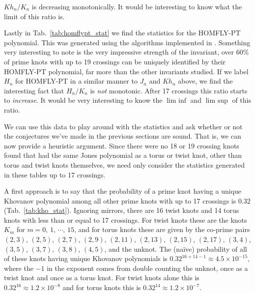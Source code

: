     $Kh_{n}/K_{n}$ is decreasing monotonically. It would be interesting to
    know what the limit of this ratio is.
    \par\hfill\par
    Lastly in Tab.~\ref{tab:homflypt_stat} we find the statistics for the
    HOMFLY-PT polynomial. This was generated using the algorithms implemented
    in \cite{regina}. Something very interesting to note is the very impressive
    strength of the invariant, over $60\%$ of prime knots with up to 19
    crossings can be uniquely identified by their HOMFLY-PT polynomial, far
    more than the other invariants studied. If we label $H_{n}$ for HOMFLY-PT
    in a similar manner to $J_{n}$ and $Kh_{n}$ above, we find the interesting
    fact that $H_{n}/K_{n}$ is \textit{not} monotonic. After 17 crossings this
    ratio starts to \textit{increase}. It would be very interesting to
    know the $\lim\textrm{ inf}$ and $\lim\textrm{ sup}$ of this ratio.
    \par\hfill\par
    We can use this data to play around with the statistics and ask whether or
    not the conjectures we've made in the previous sections are sound. That is,
    we can now provide a heuristic argument.
    Since there were no 18 or 19 crossing knots
    found that had the same Jones polynomial as a torus or twist knot, other
    than torus and twist knots themselves, we need only consider the statistics
    generated in these tables up to 17 crossings.
    \par\hfill\par
    A first approach is to say that the probability of a prime knot having a
    unique Khovanov polynomial among all other prime
    knots with up to 17 crossings is 0.32 (Tab.~\ref{tab:kho_stat}).
    Ignoring mirrors, there are 16 twist knots and 14 torus knots with
    less than or equal to 17 crossings. For twist knots these are the knots
    $K_{m}$ for $m=0,\,1,\,\cdots,\,15$, and for torus knots these are given
    by the co-prime pairs
    $(2, 3)$, $(2, 5)$, $(2, 7)$, $(2, 9)$, $(2, 11)$, $(2, 13)$,
    $(2, 15)$, $(2, 17)$, $(3, 4)$, $(3, 5)$, $(3, 7)$, $(3, 8)$, $(4, 5)$,
    and the unknot.
    The (na\"{i}ve) probability of all of these knots having unique
    Khovanov polynomials is $0.32^{16+14-1}\approx{4.5}\times{10}^{-15}$, where
    the $-1$ in the exponent comes from double counting the unknot, once as
    a twist knot and once as a torus knot.
    For twist knots alone this is $0.32^{16}\approx{1.2}\times{10}^{-8}$ and
    for torus knots this is $0.32^{14}\approx{1.2}\times{10}^{-7}$.
